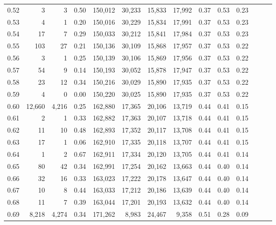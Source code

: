 \begin{tabular}{rrrrrrrrrrrrrr}
0.52 &       3 &      3 &  0.50 &  150,012 &   30,233 &  15,833 &  17,992 &  0.37 &  0.53 &      0.23 \\
0.53 &       4 &      1 &  0.20 &  150,016 &   30,229 &  15,834 &  17,991 &  0.37 &  0.53 &      0.23 \\
0.54 &      17 &      7 &  0.29 &  150,033 &   30,212 &  15,841 &  17,984 &  0.37 &  0.53 &      0.23 \\
0.55 &     103 &     27 &  0.21 &  150,136 &   30,109 &  15,868 &  17,957 &  0.37 &  0.53 &      0.22 \\
0.56 &       3 &      1 &  0.25 &  150,139 &   30,106 &  15,869 &  17,956 &  0.37 &  0.53 &      0.22 \\
0.57 &      54 &      9 &  0.14 &  150,193 &   30,052 &  15,878 &  17,947 &  0.37 &  0.53 &      0.22 \\
0.58 &      23 &     12 &  0.34 &  150,216 &   30,029 &  15,890 &  17,935 &  0.37 &  0.53 &      0.22 \\
0.59 &       4 &      0 &  0.00 &  150,220 &   30,025 &  15,890 &  17,935 &  0.37 &  0.53 &      0.22 \\
0.60 &  12,660 &  4,216 &  0.25 &  162,880 &   17,365 &  20,106 &  13,719 &  0.44 &  0.41 &      0.15 \\
0.61 &       2 &      1 &  0.33 &  162,882 &   17,363 &  20,107 &  13,718 &  0.44 &  0.41 &      0.15 \\
0.62 &      11 &     10 &  0.48 &  162,893 &   17,352 &  20,117 &  13,708 &  0.44 &  0.41 &      0.15 \\
0.63 &      17 &      1 &  0.06 &  162,910 &   17,335 &  20,118 &  13,707 &  0.44 &  0.41 &      0.15 \\
0.64 &       1 &      2 &  0.67 &  162,911 &   17,334 &  20,120 &  13,705 &  0.44 &  0.41 &      0.14 \\
0.65 &      80 &     42 &  0.34 &  162,991 &   17,254 &  20,162 &  13,663 &  0.44 &  0.40 &      0.14 \\
0.66 &      32 &     16 &  0.33 &  163,023 &   17,222 &  20,178 &  13,647 &  0.44 &  0.40 &      0.14 \\
0.67 &      10 &      8 &  0.44 &  163,033 &   17,212 &  20,186 &  13,639 &  0.44 &  0.40 &      0.14 \\
0.68 &      11 &      7 &  0.39 &  163,044 &   17,201 &  20,193 &  13,632 &  0.44 &  0.40 &      0.14 \\
0.69 &   8,218 &  4,274 &  0.34 &  171,262 &    8,983 &  24,467 &   9,358 &  0.51 &  0.28 &      0.09 \\

\end{tabular}
